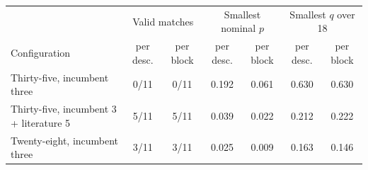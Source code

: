 \begin{tabular}{lcccccc}
\hline
 & \multicolumn{2}{c}{Valid matches} & \multicolumn{2}{c}{Smallest nominal $p$}
 & \multicolumn{2}{c}{Smallest $q$ over 18} \\
Configuration & per desc. & per block & per desc. & per block
 & per desc. & per block \\
\hline
Thirty-five, incumbent three & 0/11 & 0/11 & 0.192 & 0.061 & 0.630 & 0.630 \\
Thirty-five, incumbent 3 + literature 5 & 5/11 & 5/11 & 0.039 & 0.022 & 0.212 & 0.222 \\
Twenty-eight, incumbent three & 3/11 & 3/11 & 0.025 & 0.009 & 0.163 & 0.146 \\
\hline
\end{tabular}
